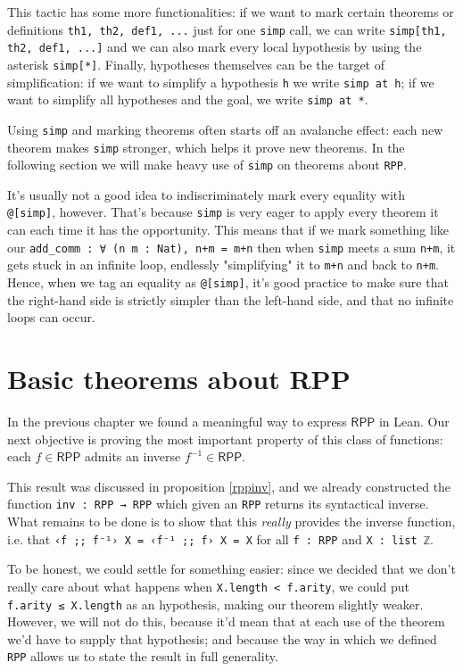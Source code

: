 \documentclass[oneside]{book}
\theoremstyle{definition}
\theoremstyle{remark}
\theoremstyle{plain}
\newcommand{\RPP}{\mathsf{RPP}}
\begin{document}
This tactic has some more functionalities: if we want to mark certain theorems or definitions \lstinline{th1, th2, def1, ...}
just for one \lstinline{simp} call, we can write \lstinline{simp[th1, th2, def1, ...]} and we can also mark every local hypothesis
by using the asterisk \lstinline{simp[*]}.
Finally, hypotheses themselves can be the target of simplification:
if we want to simplify a hypothesis \lstinline{h} we write \lstinline{simp at h};
if we want to simplify all hypotheses and the goal, we write \lstinline{simp at *}.

Using \lstinline{simp} and marking theorems often starts off an avalanche effect:
each new theorem makes \lstinline{simp} stronger, which helps it prove new theorems.
In the following section we will make heavy use of \lstinline{simp} on theorems about \lstinline{RPP}.

It's usually not a good idea to indiscriminately mark every equality with \lstinline{@[simp]}, however.
That's because \lstinline{simp} is very eager to apply every theorem it can each time it has the opportunity.
This means that if we mark something like our \lstinline{add_comm : ∀ (n m : Nat), n+m = m+n}
then when \lstinline{simp} meets a sum \lstinline{n+m}, it gets stuck in an infinite loop,
endlessly "simplifying" it to \lstinline{m+n} and back to \lstinline{n+m}.
Hence, when we tag an equality as \lstinline{@[simp]},
it's good practice to make sure that the right-hand side is strictly simpler than the left-hand side,
and that no infinite loops can occur.

\section{Basic theorems about RPP}

In the previous chapter we found a meaningful way to express $\RPP$ in Lean.
Our next objective is proving the most important property of this class of functions:
each $f \in \RPP$ admits an inverse $f^{-1} \in \RPP$.

This result was discussed in proposition \ref{rppinv},
and we already constructed the function \lstinline{inv : RPP → RPP} which given an \lstinline{RPP} returns its syntactical inverse.
What remains to be done is to show that this \textit{really} provides the inverse function,
i.e. that \lstinline{‹f ;; f⁻¹› X = ‹f⁻¹ ;; f› X = X} for all \lstinline{f : RPP} and \lstinline{X : list ℤ}.

To be honest, we could settle for something easier:
since we decided that we don't really care about what happens when \lstinline{X.length < f.arity},
we could put \lstinline{f.arity ≤ X.length} as an hypothesis, making our theorem slightly weaker.
However, we will not do this, because it'd mean that at each use of the theorem we'd have to supply that hypothesis;
and because the way in which we defined \lstinline{RPP} allows us to state the result in full generality.
\end{document}
